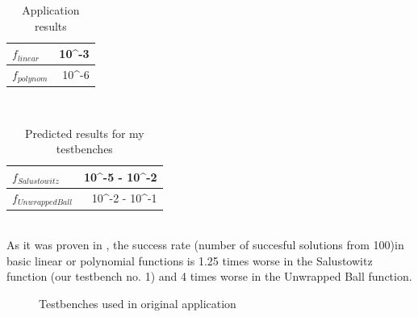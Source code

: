 \documentclass[a4paper,oneside,onecolumn,11pt]{report}
\begin{document}
	\begin{table}
		\centering
		\begin{tabular}{l | r}
			\hline
			$f_{linear}$ & 10^{-3} \\ \hline
			$f_{polynom}$ & 10^{-6}\\ \hline
		\end{tabular}
		\label{results_table_orig}
		\caption{Application results}
	\end{table}\\

	\begin{table}
		\centering
		\begin{tabular}{l | r}
			\hline
			$f_{Salustowitz}$ & 10^{-5} - 10^{-2} \\ \hline
			$f_{Unwrapped Ball}$ & 10^{-2} - 10^{-1}\\ \hline
		\end{tabular}
		\label{results_table_my}
		\caption{Predicted results for my testbenches}
	\end{table}\\

	As it was proven in
	\cite{vsikulova2012coevolution}, the success rate (number of succesful solutions from 100)in basic 
	linear or polynomial functions is 1.25 times worse in the Salustowitz function (our testbench no. 1)
	and 4 times worse in the Unwrapped Ball function.

	\begin{figure}
		\centering
		\caption{Testbenches used in original application}
		\label{his_testbenches}
	\end{figure}
\end{document}
